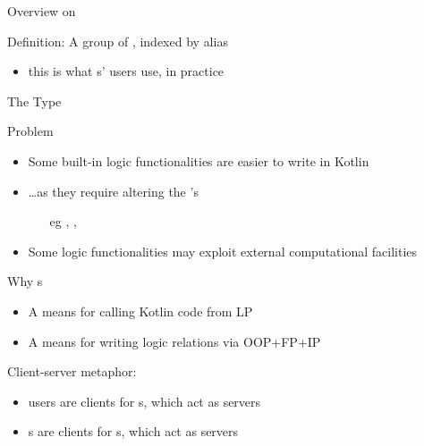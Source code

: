 \documentclass[handout]{beamer}
\begin{document}
\begin{frame}[allowframebreaks]{Overview on }
    \framebreak

    \begin{block}{Definition: }
        A group of , indexed by \alert{alias} 
    \end{block}
    \begin{itemize}
        \item this is what s' users use, in practice
    \end{itemize}

    \framebreak


\end{frame}

\begin{frame}[allowframebreaks]{The  Type}

    \begin{alertblock}{Problem}
        \begin{itemize}
            \item Some built-in logic functionalities are easier to write in Kotlin
            \item \ldots as they require \alert{altering} the 's 
            \begin{itemize}
                \item[eg] , , 
            \end{itemize}
            \item Some logic functionalities may exploit external computational facilities
        \end{itemize}
    \end{alertblock}

    \begin{block}{Why s}
        \begin{itemize}
            \item A means for calling Kotlin code from LP
            \item A means for writing logic \alert{relations} via OOP+FP+IP
        \end{itemize}
    \end{block}

    \framebreak

    Client-server metaphor:
    \begin{itemize}
        \item users are clients for s, which act as servers
        \item {}s are clients for s, which act as servers
    \end{itemize}


\end{frame}
\end{document}
